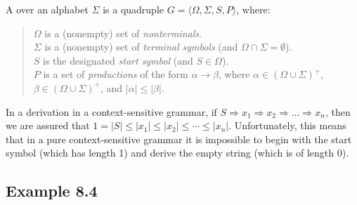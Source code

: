 \begin{dfn}\label{dfn-8.3}
A \emph{} over an alphabet $\Sigma$ is a
quadruple $G=\langle\Omega,\Sigma,S,P\rangle$, where:

\begin{quote}
$\Omega$ is a (nonempty) set of \emph{nonterminals}. \\
$\Sigma$ is a (nonempty) set of \emph{terminal symbols} (and $\Omega \cap \Sigma
	= \emptyset$). \\
$S$ is the designated \emph{start symbol} (and $S \in \Omega$). \\
$P$ is a set of \emph{productions} of the form $\alpha \rightarrow \beta$, where
	$\alpha \in (\Omega \cup \Sigma)^+$, $\beta \in (\Omega \cup \Sigma)^+$,
	and $|\alpha| \leq |\beta|$.
\end{quote}
\end{dfn}

In a derivation in a context-sensitive grammar, if $S \Rightarrow x_1
\Rightarrow x_2 \Rightarrow \ldots \Rightarrow x_n$, then we are assured that
$1 = |S| \leq |x_1| \leq |x_2| \leq \cdots \leq |x_n|$. Unfortunately, this
means that in a pure context-sensitive grammar it is impossible to begin with
the start symbol (which has length 1) and derive the empty string (which is of
length 0).

\subsection*{Example 8.4}

